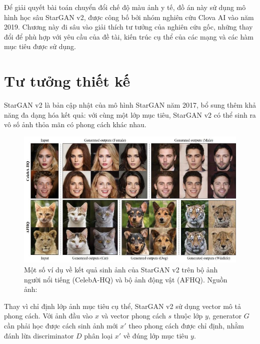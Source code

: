 \documentclass[12pt]{extreport}
\begin{document}
Để giải quyết bài toán chuyển đổi chế độ màu ảnh y tế, đồ án này sử dụng mô hình học sâu StarGAN v2, được công bố bởi nhóm nghiên cứu Clova AI vào năm 2019. Chương này đi sâu vào giải thích tư tưởng của nghiên cứu gốc, những thay đổi để phù hợp với yêu cầu của đề tài, kiến trúc cụ thể của các mạng và các hàm mục tiêu được sử dụng.

\section{Tư tưởng thiết kế}

StarGAN v2 là bản cập nhật của mô hình StarGAN năm 2017, bổ sung thêm khả năng đa dạng hóa kết quả: với cùng một lớp mục tiêu, StarGAN v2 có thể sinh ra vô số ảnh thỏa mãn có phong cách khác nhau.

\begin{figure}[H]
    \centering
    \includegraphics[width=\linewidth]{figure22.jpg}
    \caption{Một số ví dụ về kết quả sinh ảnh của StarGAN v2 trên bộ ảnh người nổi tiếng (CelebA-HQ) và bộ ảnh động vật (AFHQ). Nguồn ảnh: \cite{choi2020stargan}}
\end{figure}

Thay vì chỉ định lớp ảnh mục tiêu cụ thể, StarGAN v2 sử dụng vector mô tả phong cách. Với ảnh đầu vào $ x $ và vector phong cách $ s $ thuộc lớp $ y $, generator $ G $ cần phải học được cách sinh ảnh mới $ x' $ theo phong cách được chỉ định, nhằm đánh lừa discriminator $ D $ phân loại $ x' $ về đúng lớp mục tiêu $ y $.
\end{document}
